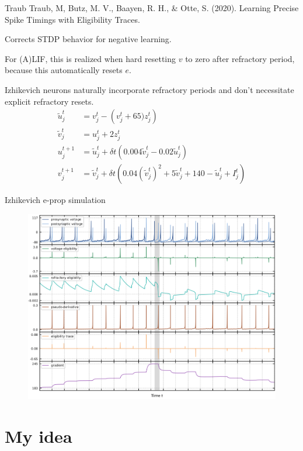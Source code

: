 \documentclass[t]{beamer}
\begin{document}
\begin{frame}{Traub}
    Traub, M, Butz, M. V., Baayen, R. H., \& Otte, S. (2020). Learning Precise Spike Timings with Eligibility Traces.

    Corrects STDP behavior for negative learning.
    
    For (A)LIF, this is realized when hard resetting $v$ to zero after refractory period, because this automatically resets $e$.
    
    Izhikevich neurons naturally incorporate refractory periods and don't necessitate explicit refractory resets.
    \begin{align*}
        \tilde{u}^t_j &= v^t_j - \left(v^t_j + 65)z^t_j\right)\\
        \tilde{v}^t_j &= u^t_j + 2z^t_j\\
        u^{t+1}_j &= \tilde{u}^t_j + \delta t\left(0.004\tilde{v}^t_j - 0.02\tilde{u}^t_j\right)\\
        v^{t+1}_j &= \tilde{v}_j^t + \delta t\left(0.04\left(\tilde{v}^t_j\right)^2+5\tilde{v}^t_j + 140 - \tilde{u}^t_j + I^t_j\right)
    \end{align*}
    
\end{frame}
\begin{frame}{Izhikevich e-prop simulation}
    
    \begin{figure}
        \centering
        \includegraphics[width=.8\textwidth]{imgs/traub.png}
    \end{figure}
\end{frame}

\section{My idea}
\end{document}
